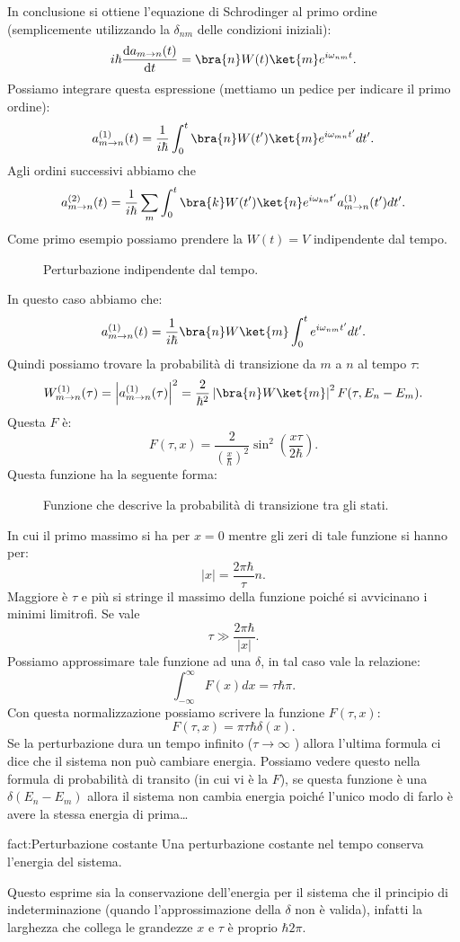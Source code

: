 In conclusione si ottiene l'equazione di Schrodinger al primo ordine (semplicemente utilizzando la $\delta_{nm}$ delle condizioni iniziali):
\[
    i\hbar \frac{\text{d} a_{m\to n}(t) }{\text{d} t} 
    =
    \bra{n}W(t) \ket{m}e^{i\omega_{nm}t }
.\] 
Possiamo integrare questa espressione (mettiamo un pedice per indicare il primo ordine):
\[
    a_{m\to n}^{(1) } (t) =
    \frac{1}{i\hbar }
    \int_{0}^{t} \bra{n}W(t')\ket{m}e^{i\omega_{mn}t'} dt'
.\] 
Agli ordini successivi abbiamo che
\[
    a_{m\to n}^{(2)}(t)=
    \frac{1}{i\hbar }
    \sum_{m}^{} \int_{0}^{t}  
    \bra{k}W(t')\ket{n}e^{i\omega_{kn}t'}a_{m\to n}^{(1)}(t')  dt'
.\] 
Come primo esempio possiamo prendere la $W(t) = V$  indipendente dal tempo. 
\begin{figure}[H]
    \centering
    \caption{Perturbazione indipendente dal tempo.}
    \label{fig:perturbazione-indipendente-dal-tempo-davvero}
\end{figure}
\noindent
In questo caso abbiamo che:
\[
    a_{m\to n}^{(1)}(t) =
    \frac{1}{i\hbar }\bra{n}W \ket{m} \int_{0}^{t} e^{i\omega_{nm}t'}dt'
.\] 
Quindi possiamo trovare la probabilità di transizione da $m$ a $n$ al tempo $\tau$:
\[
    W^{(1)}_{m\to n}(\tau)=
    \left|a_{m\to n}^{(1)}(\tau) \right|^2 = \frac{2}{\hbar^2 }\left|\bra{n}W \ket{m}\right|^2F(\tau,E_n-E_m) 
.\] 
Questa $F$ è:
\[
    F(\tau,x) = \frac{2}{\left(\frac{x}{\hbar }\right)^2}\sin^2\left(\frac{x\tau}{2\hbar }\right) 
.\] 
Questa funzione ha la seguente forma:
\begin{figure}[H]
    \centering
    \caption{Funzione che descrive la probabilità di transizione tra gli stati.}
    \label{fig:f-interazione-radiazione-materia}
\end{figure}
\noindent
In cui il primo massimo si ha per $x=0$ mentre gli zeri di tale funzione si hanno per: 
\[
\left|x\right|=\frac{2\pi\hbar }{\tau}n
.\] 
Maggiore è $\tau$ e più si stringe il massimo della funzione poiché si avvicinano i minimi limitrofi. Se vale
\[
\tau \gg \frac{2\pi\hbar }{\left|x\right|} 
.\] 
Possiamo approssimare tale funzione ad una $\delta$, in tal caso vale la relazione:
\[
    \int_{-\infty}^{\infty} F(x) dx = \tau \hbar \pi 
.\] 
Con questa normalizzazione possiamo scrivere la funzione $F(\tau,x)$: 
\[
    F(\tau,x) =\pi\tau\hbar \delta (x)  
.\] 
Se la perturbazione dura un tempo infinito ($\tau\to \infty$ ) allora l'ultima formula ci dice che il sistema non può cambiare energia. Possiamo vedere questo nella formula di probabilità di transito (in cui vi è la $F$), se questa funzione è una $\delta (E_n-E_m)$ allora il sistema non cambia energia poiché l'unico modo di farlo è avere la stessa energia di prima\ldots\\
\begin{fact}{fact:Perturbazione costante}
Una perturbazione costante nel tempo conserva l'energia del sistema.
\end{fact}
Questo esprime sia la conservazione dell'energia per il sistema che il principio di indeterminazione (quando l'approssimazione della $\delta$ non è valida), infatti la larghezza che collega le grandezze $x$ e $\tau$ è proprio $\hbar 2\pi$.
